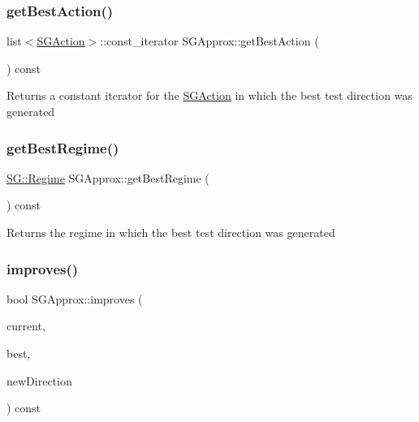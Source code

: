 \subsubsection{\texorpdfstring{get\+Best\+Action()}{getBestAction()}}
{\footnotesize\ttfamily list$<$\hyperlink{classSGAction}{S\+G\+Action}$>$\+::const\+\_\+iterator S\+G\+Approx\+::get\+Best\+Action (\begin{DoxyParamCaption}{ }\end{DoxyParamCaption}) const\hspace{0.3cm}{\ttfamily [inline]}}

Returns a constant iterator for the \hyperlink{classSGAction}{S\+G\+Action} in which the best test direction was generated \mbox{\label{classSGApprox_a5323e34b4a796d1667d93d6d62e5fe29}} 
\subsubsection{\texorpdfstring{get\+Best\+Regime()}{getBestRegime()}}
{\footnotesize\ttfamily \hyperlink{namespaceSG_a139e4dec41ea0f38aae1f93f60cfff60}{S\+G\+::\+Regime} S\+G\+Approx\+::get\+Best\+Regime (\begin{DoxyParamCaption}{ }\end{DoxyParamCaption}) const\hspace{0.3cm}{\ttfamily [inline]}}

Returns the regime in which the best test direction was generated \mbox{\label{classSGApprox_a1f34b002a7000a29338425ed4b452d86}} 
\subsubsection{\texorpdfstring{improves()}{improves()}}
{\footnotesize\ttfamily bool S\+G\+Approx\+::improves (\begin{DoxyParamCaption}\item[{const \hyperlink{classSGPoint}{S\+G\+Point} \&}]{current,  }\item[{const \hyperlink{classSGPoint}{S\+G\+Point} \&}]{best,  }\item[{const \hyperlink{classSGPoint}{S\+G\+Point} \&}]{new\+Direction }\end{DoxyParamCaption}) const\hspace{0.3cm}{\ttfamily [private]}}



